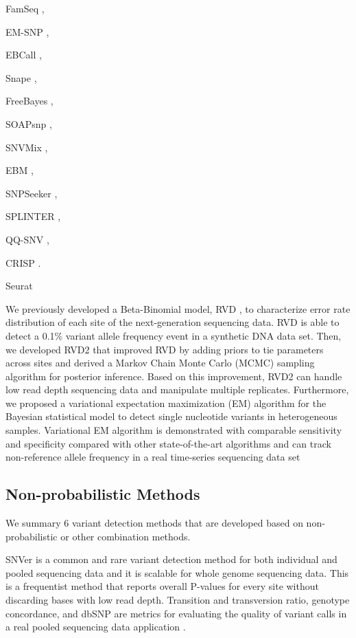 \documentclass[11pt,reqno]{amsart}
\begin{document}
FamSeq \citep{Peng2013},


EM-SNP \citep{Chen2013},


EBCall \citep{Shiraishi2013},

Snape \citep{Raineri2012},

FreeBayes \citep{Garrison2012},

SOAPsnp \citep{Li2009},

SNVMix \citep{Goya2010},

EBM \citep{Zhou2012},

SNPSeeker \citep{Druley2009},

SPLINTER \citep{Spencer2014},

QQ-SNV \citep{VanderBorght2015},

CRISP \citep{Bansal2010}.

Seurat \citep{Christoforides2013}

We previously developed a Beta-Binomial model, RVD \citep{Flaherty2012}, to characterize error rate distribution of each site of the next-generation sequencing data.
RVD is able to detect a 0.1\% variant allele frequency event in a synthetic DNA data set.
Then, we developed RVD2 \citep{He2015} that improved RVD by adding priors to tie parameters across sites and derived a Markov Chain Monte Carlo (MCMC) sampling algorithm for posterior inference.
Based on this improvement, RVD2 can handle low read depth sequencing data and manipulate multiple replicates.
Furthermore, we proposed a variational expectation maximization (EM) algorithm \citep{zhang2016variational} for the Bayesian statistical model to detect single nucleotide variants in heterogeneous samples.
Variational EM algorithm is demonstrated with comparable sensitivity and specificity compared with other state-of-the-art algorithms and can track non-reference allele frequency in a real time-series sequencing data set


\subsection{Non-probabilistic Methods}
We summary 6 variant detection methods that are developed based on non-probabilistic or other combination methods.

SNVer \citep{Wei2011} is a common and rare variant detection method for both individual and pooled sequencing data and it is scalable for whole genome sequencing data.
This is a frequentist method that reports overall P-values for every site without discarding bases with low read depth.
Transition and transversion ratio, genotype concordance, and dbSNP are metrics for evaluating the quality of variant calls in a real pooled sequencing data application \citep{depristo2011framework}.
\end{document}
